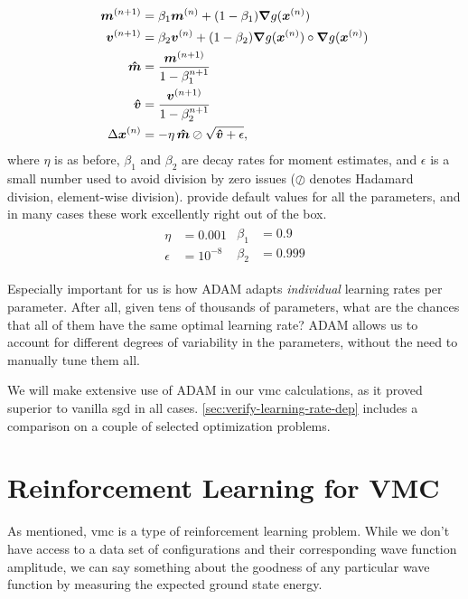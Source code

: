 \documentclass[Thesis.tex]{subfiles}
\begin{document}
\begin{align}
  \bm{m}^{(n+1)} &= \beta_1 \bm{m}^{(n)} + (1 - \beta_1)\grad{g(\bm{x}^{(n)})}\\
  \bm{v}^{(n+1)} &= \beta_2 \bm{v}^{(n)} + (1 - \beta_2)\grad{g(\bm{x}^{(n)})}\circ\grad{g(\bm{x}^{(n)})}\\
  \bm{\hat m} &= \frac{\bm{m}^{(n+1)}}{1 - \beta_1^{n+1}}\\
  \bm{\hat v} &= \frac{\bm{v}^{(n+1)}}{1 - \beta_2^{n+1}}\\
  \Delta \bm{x}^{(n)}&= -\eta\, \bm{\hat m}\oslash\sqrt{\bm{\hat v} + \epsilon},
\end{align}
where $\eta$ is as before, $\beta_1$ and $\beta_2$ are decay rates for moment
estimates, and $\epsilon$ is a small number used to avoid division by zero
issues ($\oslash$ denotes Hadamard division, element-wise division). \textcite{KingmaB14} provide default values for all the parameters, and
in many cases these work excellently right out of the box.
\begin{align}
  \label{eq:adam-default-parameters}
  \begin{split}
    \eta &= 0.001\\
    \epsilon &= 10^{-8}
  \end{split}
  \begin{split}
    \beta_1 &= 0.9\\
    \beta_2 &= 0.999
  \end{split}
\end{align}

Especially important for us is how ADAM adapts \emph{individual} learning rates
per parameter. After all, given tens of thousands of parameters, what are the
chances that all of them have the same optimal learning rate? ADAM allows us to
account for different degrees of variability in the parameters, without the need
to manually tune them all.

We will make extensive use of ADAM in our \gls{vmc} calculations, as it proved
superior to vanilla \gls{sgd} in all cases. \cref{sec:verify-learning-rate-dep}
includes a comparison on a couple of selected optimization problems.


\section{Reinforcement Learning for VMC}
\label{sec:reinf-learning-for-vmc}

As mentioned, \gls{vmc} is a type of reinforcement learning problem. While we don't
have access to a data set of configurations and their corresponding wave
function amplitude, we can say something about the goodness of any particular
wave function by measuring the expected ground state energy.
\end{document}
